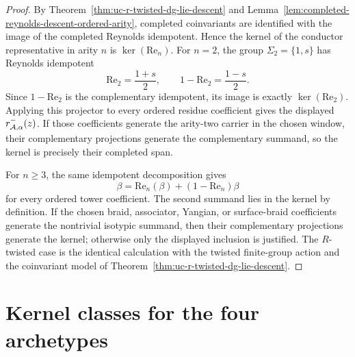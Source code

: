\begin{proof}
By Theorem~\ref{thm:uc-r-twisted-dg-lie-descent} and
Lemma~\ref{lem:completed-reynolds-descent-ordered-arity}, completed
coinvariants are identified with the image of the completed Reynolds
idempotent.  Hence the kernel of the conductor representative in arity
\(n\) is \(\ker(\mathrm{Re}_n)\).  For \(n=2\), the group
\(\Sigma_2=\{1,s\}\) has Reynolds idempotent
\[
\mathrm{Re}_2=\frac{1+s}{2},
\qquad
1-\mathrm{Re}_2=\frac{1-s}{2}.
\]
Since \(1-\mathrm{Re}_2\) is the complementary idempotent, its image is
exactly \(\ker(\mathrm{Re}_2)\).  Applying this projector to every
ordered residue coefficient gives the displayed
\(r_{\mathcal{A},\alpha}^{-}(z)\).  If those coefficients generate the
arity-two carrier in the chosen window, their complementary
projections generate the complementary summand, so the kernel is
precisely their completed span.

For \(n\ge3\), the same idempotent decomposition gives
\[
\beta=\mathrm{Re}_n(\beta)+(1-\mathrm{Re}_n)\beta
\]
for every ordered tower coefficient.  The second summand lies in the
kernel by definition.  If the chosen braid, associator, Yangian, or
surface-braid coefficients generate the nontrivial isotypic summand,
then their complementary projections generate the kernel; otherwise
only the displayed inclusion is justified.  The \(R\)-twisted case is
the identical calculation with the twisted finite-group action and the
coinvariant model of
Theorem~\ref{thm:uc-r-twisted-dg-lie-descent}.
\end{proof}

\section{Kernel classes for the four archetypes}
\label{sec:uc-kernel}


